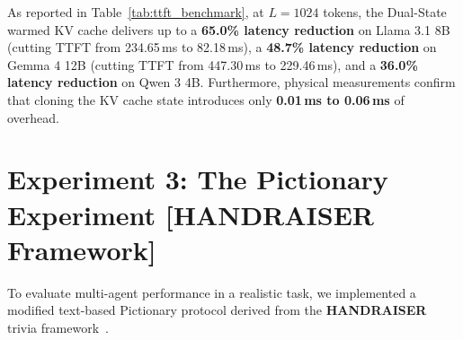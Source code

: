 \documentclass{article}
\begin{document}
As reported in Table~\ref{tab:ttft_benchmark}, at $L=1024$ tokens, the Dual-State warmed KV cache delivers up to a \textbf{65.0\% latency reduction} on Llama 3.1 8B (cutting TTFT from 234.65\,ms to 82.18\,ms), a \textbf{48.7\% latency reduction} on Gemma 4 12B (cutting TTFT from 447.30\,ms to 229.46\,ms), and a \textbf{36.0\% latency reduction} on Qwen 3 4B. Furthermore, physical measurements confirm that cloning the KV cache state introduces only \textbf{0.01\,ms to 0.06\,ms} of overhead.

\section{Experiment 3: The Pictionary Experiment [HANDRAISER Framework]}

To evaluate multi-agent performance in a realistic task, we implemented a modified text-based Pictionary protocol derived from the \textbf{HANDRAISER} trivia framework~\citep{rodriguez2021quizbowl}.
\end{document}
